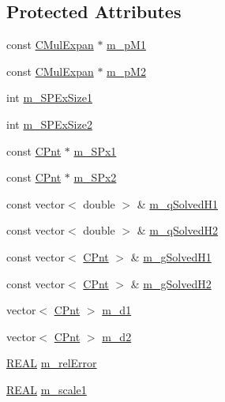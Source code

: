 \subsection*{Protected Attributes}
\begin{DoxyCompactItemize}
\item 
const \hyperlink{classCMulExpan}{C\-Mul\-Expan} $\ast$ \hyperlink{classCXFormN_ad5bac4096494726a30b968d16b37a8c6}{m\-\_\-p\-M1}
\item 
const \hyperlink{classCMulExpan}{C\-Mul\-Expan} $\ast$ \hyperlink{classCXFormN_a049b428205fa09f8c3699b2a5e6a11e9}{m\-\_\-p\-M2}
\item 
int \hyperlink{classCXFormN_ad99196d70f35db744dc2f17c9fae6777}{m\-\_\-\-S\-P\-Ex\-Size1}
\item 
int \hyperlink{classCXFormN_a43db5d871fd5e0a81a02a060973d3690}{m\-\_\-\-S\-P\-Ex\-Size2}
\item 
const \hyperlink{classCPnt}{C\-Pnt} $\ast$ \hyperlink{classCXFormN_ac68972e3302f0d5c782e43b43b9364b7}{m\-\_\-\-S\-Px1}
\item 
const \hyperlink{classCPnt}{C\-Pnt} $\ast$ \hyperlink{classCXFormN_acc333110082ec31777931260cf46321d}{m\-\_\-\-S\-Px2}
\item 
const vector$<$ double $>$ \& \hyperlink{classCXFormN_ade4e835cb0f6dba67e81111c56da5180}{m\-\_\-q\-Solved\-H1}
\item 
const vector$<$ double $>$ \& \hyperlink{classCXFormN_a431ca150845793df8990f605c56e70fc}{m\-\_\-q\-Solved\-H2}
\item 
const vector$<$ \hyperlink{classCPnt}{C\-Pnt} $>$ \& \hyperlink{classCXFormN_aba7bfc6b31aed0aace8508eef8989c2a}{m\-\_\-g\-Solved\-H1}
\item 
const vector$<$ \hyperlink{classCPnt}{C\-Pnt} $>$ \& \hyperlink{classCXFormN_a0184838e6a610a6127060e2e6a2d6d76}{m\-\_\-g\-Solved\-H2}
\item 
vector$<$ \hyperlink{classCPnt}{C\-Pnt} $>$ \hyperlink{classCXFormN_ad563b4d395fbf65c10d0f4e90d8750d4}{m\-\_\-d1}
\item 
vector$<$ \hyperlink{classCPnt}{C\-Pnt} $>$ \hyperlink{classCXFormN_a490d5eaabe5bc880b43564059cda59b1}{m\-\_\-d2}
\item 
\hyperlink{util_8h_a5821460e95a0800cf9f24c38915cbbde}{R\-E\-A\-L} \hyperlink{classCXFormN_a995b3cf2414f9485de231271b8ab3ba2}{m\-\_\-rel\-Error}
\item 
\hyperlink{util_8h_a5821460e95a0800cf9f24c38915cbbde}{R\-E\-A\-L} \hyperlink{classCXFormN_aeff7efc19ca07477f2af6bd47d5633ed}{m\-\_\-scale1}
\item 

\end{DoxyCompactItemize}

